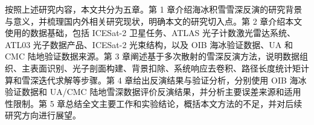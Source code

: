 按照上述研究内容，本文共分为五章。第 1 章介绍海冰积雪雪深反演的研究背景与意义，并梳理国内外相关研究现状，明确本文的研究切入点。第 2 章介绍本文使用的数据基础，包括 ICESat-2 卫星任务、ATLAS 光子计数激光雷达系统、ATL03 光子数据产品、ICESat-2 光束结构，以及 OIB 海冰验证数据、UA 和 CMC 陆地验证数据来源。第 3 章阐述基于多次散射的雪深反演方法，说明数据组织、主表面识别、光子剖面构建、背景扣除、系统响应去卷积、路径长度统计矩计算和雪深迭代求解等步骤。第 4 章给出反演结果与验证分析，分别使用 OIB 海冰验证数据和 UA/CMC 陆地雪深数据评价反演结果，并分析主要误差来源和适用性限制。第 5 章总结全文主要工作和实验结论，概括本文方法的不足，并对后续研究方向进行展望。